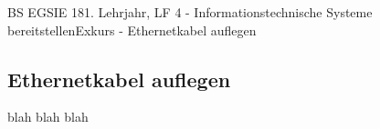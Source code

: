 \documentclass[oneside,openany,headings=optiontotoc,11pt,numbers=noenddot]{article}
\begin{document}
	\begin{worksheet}{BS EGSIE 18}{1. Lehrjahr, LF 4 - Informationstechnische Systeme bereitstellen}{Exkurs - Ethernetkabel auflegen}
		\onehalfspacing
		\clearpage
		\subsection{Ethernetkabel auflegen}
		blah blah blah
	\end{worksheet}
\end{document}
